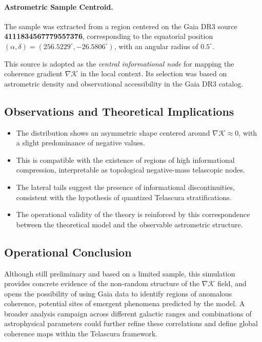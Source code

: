 \documentclass[12pt]{article}
\begin{document}
\paragraph{Astrometric Sample Centroid.}
The sample was extracted from a region centered on the Gaia DR3 source \textbf{4111834567779557376}, corresponding to the equatorial position $(\alpha, \delta) = (256.5229^\circ, -26.5806^\circ)$, with an angular radius of $0.5^\circ$.

This source is adopted as the \textit{central informational node} for mapping the coherence gradient $\nabla \mathcal{K}$ in the local context. Its selection was based on astrometric density and observational accessibility in the Gaia DR3 catalog.

\subsection*{Observations and Theoretical Implications}

\begin{itemize}
    \item The distribution shows an asymmetric shape centered around $\nabla \mathcal{K} \approx 0$, with a slight predominance of negative values.
    \item This is compatible with the existence of regions of high informational compression, interpretable as topological negative-mass telascopic nodes.
    \item The lateral tails suggest the presence of informational discontinuities, consistent with the hypothesis of quantized Telascura stratifications.
    \item The operational validity of the theory is reinforced by this correspondence between the theoretical model and the observable astrometric structure.
\end{itemize}

\subsection*{Operational Conclusion}

Although still preliminary and based on a limited sample, this simulation provides concrete evidence of the non-random structure of the $\nabla \mathcal{K}$ field, and opens the possibility of using Gaia data to identify regions of anomalous coherence, potential sites of emergent phenomena predicted by the model. A broader analysis campaign across different galactic ranges and combinations of astrophysical parameters could further refine these correlations and define global coherence maps within the Telascura framework.
\end{document}
